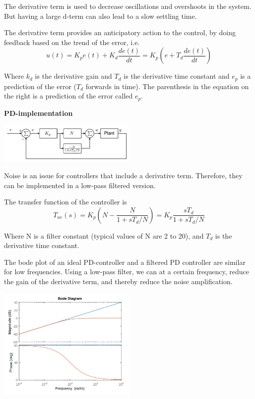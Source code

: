 The derivative term is used to decrease oscillations and overshoots in the system.
But having a large d-term can also lead to a slow settling time.

The derivative term provides an anticipatory action to the control,
by doing feedback based on the trend of the error, i.e.
$$u(t) = K_p e(t) + K_d \frac{de(t)}{dt} = K_p \left(e+T_d\frac{de(t)}{dt}\right)$$

Where $k_d$ is the derivative gain and $T_d$ is the derivative time constant and $e_p$
is a prediction of the error  ($T_d$ forwards in time). The parenthesis in the equation on the right
is a prediction of the error called $e_p$.

\textbf{PD-implementation}
\begin{center}
	\includegraphics[width = 0.5\textwidth]{Images/PD-implementation.png}
\end{center}

Noise is an issue for controllers that include a derivative term. Therefore, they can
be implemented in a low-pass filtered version.

The transfer function of the controller is
$$T_{ue}(s) = K_p \left(N-\frac{N}{1+sT_d/N}\right) = K_p \frac{sT_d}{1+sT_d/N}$$

Where N is a filter constant (typical values of N are 2 to 20), and $T_d$ is the derivative time constant.

\newpage

The bode plot of an ideal PD-controller and a filtered PD controller are similar for low frequencies.
Using a low-pass filter, we can at a certain frequency, reduce the gain of the derivative term, and
thereby reduce the noise amplification.

\begin{center}
	\includegraphics[width = 0.5\textwidth]{Images/bode-pd.png}
\end{center}

